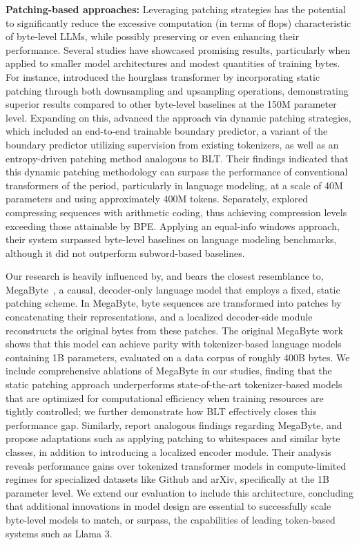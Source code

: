 \textbf{Patching-based approaches:} Leveraging patching strategies has the potential to significantly reduce the excessive computation (in terms of flops) characteristic of byte-level LLMs, while possibly preserving or even enhancing their performance. Several studies have showcased promising results, particularly when applied to smaller model architectures and modest quantities of training bytes. For instance, \cite{nawrot-etal-2022-hierarchical} introduced the hourglass transformer by incorporating static patching through both downsampling and upsampling operations, demonstrating superior results compared to other byte-level baselines at the 150M parameter level. Expanding on this, \cite{nawrot-etal-2023-efficient} advanced the approach via dynamic patching strategies, which included an end-to-end trainable boundary predictor, a variant of the boundary predictor utilizing supervision from existing tokenizers, as well as an entropy-driven patching method analogous to {\textsc BLT}. Their findings indicated that this dynamic patching methodology can surpass the performance of conventional transformers of the period, particularly in language modeling, at a scale of 40M parameters and using approximately 400M tokens. Separately, \cite{lester2024training} explored compressing sequences with arithmetic coding, thus achieving compression levels exceeding those attainable by BPE. Applying an equal-info windows approach, their system surpassed byte-level baselines on language modeling benchmarks, although it did not outperform subword-based baselines.

Our research is heavily influenced by, and bears the closest resemblance to, MegaByte~\citep{yu2023megabyte}, a causal, decoder-only language model that employs a fixed, static patching scheme. In MegaByte, byte sequences are transformed into patches by concatenating their representations, and a localized decoder-side module reconstructs the original bytes from these patches. The original MegaByte work shows that this model can achieve parity with tokenizer-based language models containing 1B parameters, evaluated on a data corpus of roughly 400B bytes. We include comprehensive ablations of MegaByte in our studies, finding that the static patching approach underperforms state-of-the-art tokenizer-based models that are optimized for computational efficiency when training resources are tightly controlled; we further demonstrate how {\textsc BLT} effectively closes this performance gap. Similarly, \cite{slagle2024spacebyte} report analogous findings regarding MegaByte, and propose adaptations such as applying patching to whitespaces and similar byte classes, in addition to introducing a localized encoder module. Their analysis reveals performance gains over tokenized transformer models in compute-limited regimes for specialized datasets like Github and arXiv, specifically at the 1B parameter level. We extend our evaluation to include this architecture, concluding that additional innovations in model design are essential to successfully scale byte-level models to match, or surpass, the capabilities of leading token-based systems such as Llama 3.

